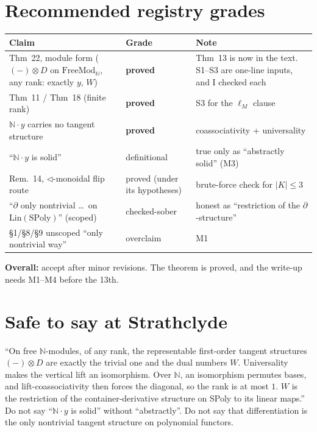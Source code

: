 \documentclass[11pt]{article}
\newcommand{\tri}{\mathbin{\triangleleft}}
\newcommand{\N}{\mathbb{N}}
\begin{document}
\section{Recommended registry grades}
\begin{center}\small
\begin{tabular}{p{7.4cm}p{2.4cm}p{5.4cm}}
\toprule
Claim & Grade & Note\\\midrule
Thm~22, module form ($(-)\otimes D$ on $\mathrm{FreeMod}_\N$, any rank: exactly $y$, $W$) &
\textbf{proved} & Thm~13 is now in the text. S1--S3 are one-line inputs, and I checked each\\
Thm~11 / Thm~18 (finite rank) & \textbf{proved} & S3 for the $\ell_M$ clause\\
$\N\cdot y$ carries no tangent structure & \textbf{proved} & coassociativity + universality\\
``$\N\cdot y$ is solid'' & definitional & true only as ``abstractly solid'' (M3)\\
Rem.~14, $\tri$-monoidal flip route & proved (under its hypotheses) & brute-force check for $|K|\le3$\\
``$\partial$ only nontrivial \dots\ on $\mathrm{Lin}(\mathrm{SPoly})$'' (scoped) & checked-sober &
honest as ``restriction of the $\partial$-structure''\\
\S1/\S8/\S9 unscoped ``only nontrivial way'' & overclaim & M1\\
\bottomrule
\end{tabular}
\end{center}
\textbf{Overall:} accept after minor revisions. The theorem is proved, and the write-up needs
M1--M4 before the 13th.

\section*{Safe to say at Strathclyde}
``On free $\N$-modules, of any rank, the representable first-order tangent structures
$(-)\otimes D$ are exactly the trivial one and the dual numbers $W$. Universality makes the
vertical lift an isomorphism. Over $\N$, an isomorphism permutes bases, and lift-coassociativity
then forces the diagonal, so the rank is at most $1$. $W$ is the restriction of the
container-derivative structure on SPoly to its linear maps.'' Do not say ``$\N\cdot y$ is solid''
without ``abstractly''. Do not say that differentiation is the only nontrivial tangent structure on
polynomial functors.
\end{document}

